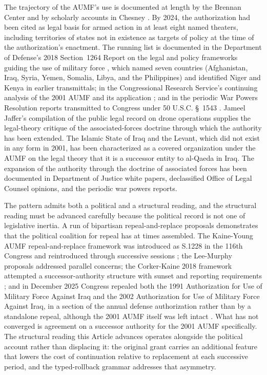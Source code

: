 The trajectory of the AUMF's use is documented at length by the Brennan Center
\cite{ref_brennan_center_aumf} and by scholarly accounts in Chesney \cite{ref_chesney_aumf}.
By 2024, the authorization had been cited as legal basis for armed action in at least eight named
theaters, including territories of states not in existence as targets of policy at the time of the
authorization's enactment.
The running list is documented in the Department of Defense's 2018 Section~1264 Report on the legal and
policy frameworks guiding the use of military force \cite{ref_dod_1264_report_2018}, which named seven
countries (Afghanistan, Iraq, Syria, Yemen, Somalia, Libya, and the Philippines) and identified Niger
and Kenya in earlier transmittals; in the Congressional Research Service's continuing analysis of the
2001 AUMF and its application \cite{ref_crs_r43983_aumf}; and in the periodic War Powers Resolution
reports transmitted to Congress under 50 U.S.C. \S~1543
\cite{ref_war_powers_reports_2021_2023}.
Jameel Jaffer's compilation of the public legal record on drone operations
\cite{ref_jaffer_aumf} supplies the legal-theory critique of the associated-forces doctrine through
which the authority has been extended.
The Islamic State of Iraq and the Levant, which did not exist in any form in 2001, has been
characterized as a covered organization under the AUMF on the legal theory that it is a successor
entity to al-Qaeda in Iraq.
The expansion of the authority through the doctrine of associated forces has been documented in
Department of Justice white papers, declassified Office of Legal Counsel opinions, and the periodic war
powers reports.

The pattern admits both a political and a structural reading, and the structural reading must be
advanced carefully because the political record is not one of legislative inertia.
A run of bipartisan repeal-and-replace proposals demonstrates that the political coalition for repeal
has at times assembled.
The Kaine-Young AUMF repeal-and-replace framework was introduced as S.1228 in the 116th Congress and
reintroduced through successive sessions \cite{ref_kaine_young_aumf}; the Lee-Murphy proposals
addressed parallel concerns; the Corker-Kaine 2018 framework attempted a successor-authority structure
with sunset and reporting requirements \cite{ref_corker_kaine_2018}; and in December 2025 Congress
repealed both the 1991 Authorization for Use of Military Force Against Iraq and the 2002 Authorization
for Use of Military Force Against Iraq, in a section of the annual defense authorization rather than by a
standalone repeal, although the 2001 AUMF itself was left intact \cite{ref_iraq_aumf_repeal_2025}.
What has not converged is agreement on a successor authority for the 2001 AUMF specifically.
The structural reading this Article advances operates alongside the political account rather than
displacing it: the original grant carries an additional feature that lowers the cost of continuation
relative to replacement at each successive period, and the typed-rollback grammar addresses that
asymmetry.

